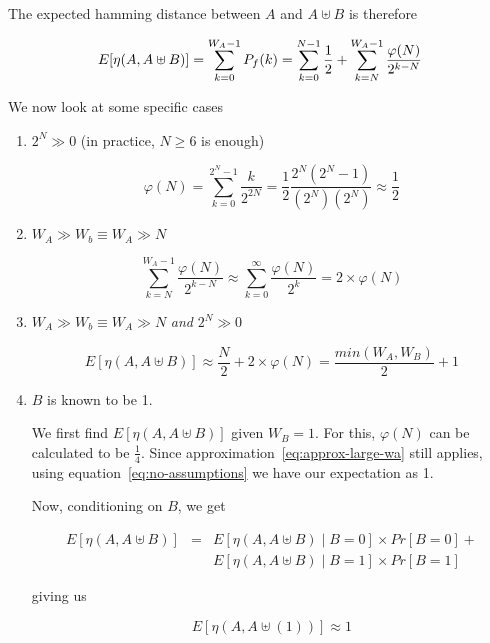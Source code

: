 The expected hamming distance between $A$ and $A \uplus B$ is therefore

\begin{equation}
  \label{eq:no-assumptions}
  E[\eta(A, A \uplus B)]
  = \displaystyle\sum\limits_{k=0}^{W_A - 1} P_f(k) \\
  = \displaystyle\sum\limits_{k=0}^{N - 1} \frac{1}{2} + 
  \displaystyle\sum\limits_{k=N}^{W_A - 1} \frac{\varphi(N)}{2^{k - N}}
\end{equation}

We now look at some specific cases

\begin{enumerate}
  \item $2^N \gg 0$ (in practice, $N \geq 6$ is enough)

    \begin{equation}
      \varphi(N) = \displaystyle\sum\limits_{k=0}^{2^{N} - 1} \frac{k}{2^{2 N}} = 
      \frac{1}{2} \frac{2^N (2^N - 1)}{(2^N) (2^N)}
      \approx \frac{1}{2}
    \end{equation}

  \item $W_A \gg W_b \equiv W_A \gg N$

    \begin{equation}
      \label{eq:approx-large-wa}
      \displaystyle\sum\limits_{k=N}^{W_A - 1} \frac{\varphi(N)}{2^{k - N}} \approx
      \displaystyle\sum\limits_{k=0}^{\infty} \frac{\varphi(N)}{2^k} = 2 \times \varphi(N)
    \end{equation}

  \item $W_A \gg W_b \equiv W_A \gg N$ \textit{and} $2^N \gg 0$

    \begin{equation}
      E[\eta(A, A \uplus B)] \approx \frac{N}{2} + 2 \times \varphi(N) = 
      \frac{min(W_A, W_B)}{2} + 1
    \end{equation}

  \item $B$ is known to be 1.

    We first find $E[\eta(A, A \uplus B)]$ given $W_B = 1$.  For this,
    $\varphi(N)$ can be calculated to be $\frac{1}{4}$.  Since
    approximation~\ref{eq:approx-large-wa} still applies, using
    equation~\ref{eq:no-assumptions} we have our expectation as 1.

    Now, conditioning on $B$, we get

    \begin{eqnarray*}
      E[\eta(A, A \uplus B)] & = & E[\eta(A, A \uplus B) \mid B = 0]
      \times Pr[B = 0] + \\
      && E[\eta(A, A \uplus B) \mid B = 1] \times Pr[B
        = 1]
    \end{eqnarray*}

    giving us

    \begin{equation}
      \label{eq:average-flips}
      E[\eta(A, A \uplus (1))] \approx 1
    \end{equation}

\end{enumerate}

